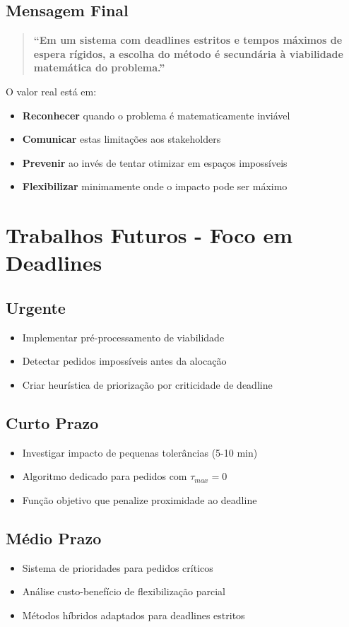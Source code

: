 \documentclass[11pt,a4paper]{article}
\begin{document}
\subsection{Mensagem Final}

\begin{quote}
\textbf{``Em um sistema com deadlines estritos e tempos máximos de espera rígidos, a escolha do método é secundária à viabilidade matemática do problema.''}
\end{quote}

O valor real está em:
\begin{itemize}
    \item \textbf{Reconhecer} quando o problema é matematicamente inviável
    \item \textbf{Comunicar} estas limitações aos stakeholders
    \item \textbf{Prevenir} ao invés de tentar otimizar em espaços impossíveis
    \item \textbf{Flexibilizar} minimamente onde o impacto pode ser máximo
\end{itemize}

\section{Trabalhos Futuros - Foco em Deadlines}

\subsection{Urgente}
\begin{itemize}
    \item Implementar pré-processamento de viabilidade
    \item Detectar pedidos impossíveis antes da alocação
    \item Criar heurística de priorização por criticidade de deadline
\end{itemize}

\subsection{Curto Prazo}
\begin{itemize}
    \item Investigar impacto de pequenas tolerâncias (5-10 min)
    \item Algoritmo dedicado para pedidos com $\tau_{max} = 0$
    \item Função objetivo que penalize proximidade ao deadline
\end{itemize}

\subsection{Médio Prazo}
\begin{itemize}
    \item Sistema de prioridades para pedidos críticos
    \item Análise custo-benefício de flexibilização parcial
    \item Métodos híbridos adaptados para deadlines estritos
\end{itemize}
\end{document}
